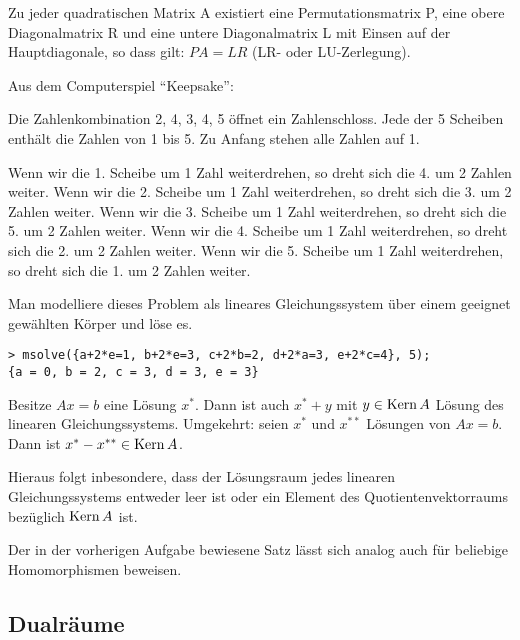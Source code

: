 \documentclass[10pt]{scrbook}
\begin{document}
\begin{Sa}
Zu jeder quadratischen Matrix A existiert eine Permutationsmatrix P, eine obere Diagonalmatrix R und eine untere Diagonalmatrix L mit Einsen auf der Hauptdiagonale, so dass gilt: $P A=L R$ (LR- oder LU-Zerlegung).
\end{Sa}

\begin{Auf}
Aus dem Computerspiel "`Keepsake"':

Die Zahlenkombination 2, 4, 3, 4, 5 öffnet ein Zahlenschloss. Jede der 5 Scheiben enthält die Zahlen von 1 bis 5. Zu Anfang stehen alle Zahlen auf 1.

Wenn wir die 1. Scheibe um 1 Zahl weiterdrehen, so dreht sich die 4. um 2 Zahlen weiter.
Wenn wir die 2. Scheibe um 1 Zahl weiterdrehen, so dreht sich die 3. um 2 Zahlen weiter.
Wenn wir die 3. Scheibe um 1 Zahl weiterdrehen, so dreht sich die 5. um 2 Zahlen weiter.
Wenn wir die 4. Scheibe um 1 Zahl weiterdrehen, so dreht sich die 2. um 2 Zahlen weiter.
Wenn wir die 5. Scheibe um 1 Zahl weiterdrehen, so dreht sich die 1. um 2 Zahlen weiter.

Man modelliere dieses Problem als lineares Gleichungssystem über einem geeignet gewählten Körper und löse es.
\end{Auf}
\begin{Loe}
\begin{verbatim}
> msolve({a+2*e=1, b+2*e=3, c+2*b=2, d+2*a=3, e+2*c=4}, 5);
{a = 0, b = 2, c = 3, d = 3, e = 3}
\end{verbatim}
\end{Loe}

\begin{Auf}
Besitze $A x=b$ eine Lösung $x^*$. Dann ist auch $x^*+y$ mit $y\in\operatorname{Kern} A$ Lösung des linearen Gleichungssystems. Umgekehrt: seien $x^*$ und $x^{**}$ Lösungen von $A x=b$. Dann ist $x^*-x^{**}\in \operatorname{Kern} A$.

Hieraus folgt inbesondere, dass der Lösungsraum jedes linearen Gleichungssystems entweder leer ist oder ein Element des Quotientenvektorraums bezüglich $\operatorname{Kern} A$ ist.
\end{Auf}

\begin{Bem}
Der in der vorherigen Aufgabe bewiesene Satz lässt sich analog auch für beliebige Homomorphismen beweisen.
\end{Bem}

\subsection{Dualräume}
\end{document}
